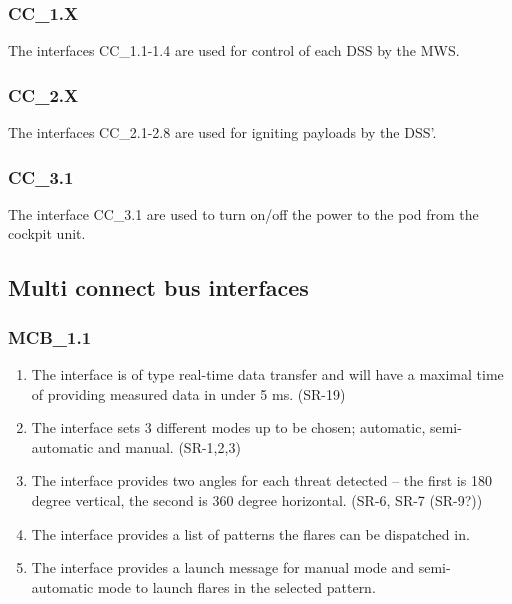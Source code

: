 \documentclass[Main]{subfiles}
\begin{document}
\subsubsection{CC\_1.X}
The interfaces CC\_1.1-1.4 are used for control of each DSS by the MWS. 

\subsubsection{CC\_2.X}
The interfaces CC\_2.1-2.8 are used for igniting payloads by the DSS'.

\subsubsection{CC\_3.1}
The interface CC\_3.1 are used to turn on/off the power to the pod from the cockpit unit.


\subsection{Multi connect bus interfaces}

\subsubsection{MCB\_1.1}
\begin{enumerate}[label = \bfseries ID-\arabic*]
\setcounter{enumi}{0}

\item The interface is of type real-time data transfer and will have a maximal time of providing measured data in under 5 ms. (SR-19)

\item The interface sets 3 different modes up to be chosen; automatic, semi-automatic and manual. (SR-1,2,3)

\item The interface provides two angles for each threat detected -- the first is 180 degree vertical, the second is 360 degree horizontal. (SR-6, SR-7 (SR-9?))

\item The interface provides a list of patterns the flares can be dispatched in.

\item The interface provides a launch message for manual mode and semi-automatic mode to launch flares in the selected pattern.
\end{enumerate}

\end{document}
